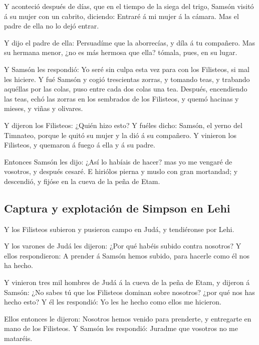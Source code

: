  Y aconteció después de días, que en el tiempo de la siega
del trigo, Samsón visitó á su mujer con un cabrito, diciendo: Entraré á
mi mujer á la cámara. Mas el padre de ella no lo dejó entrar.

 Y dijo el padre de ella: Persuadíme que la aborrecías, y
díla á tu compañero. Mas su hermana menor, ¿no es más hermosa que ella?
tómala, pues, en su lugar.

 Y Samsón les respondió: Yo seré sin culpa esta vez para con
los Filisteos, si mal les hiciere.  Y fué Samsón y cogió
trescientas zorras, y tomando teas, y trabando aquéllas por las colas,
puso entre cada dos colas una tea.  Después, encendiendo las
teas, echó las zorras en los sembrados de los Filisteos, y quemó hacinas
y mieses, y viñas y olivares.

 Y dijeron los Filisteos: ¿Quién hizo esto? Y fuéles dicho:
Samsón, el yerno del Timnateo, porque le quitó su mujer y la dió á su
compañero. Y vinieron los Filisteos, y quemaron á fuego á ella y á su
padre.

 Entonces Samsón les dijo: ¿Así lo habíais de hacer? mas yo
me vengaré de vosotros, y después cesaré.  E hiriólos pierna
y muslo con gran mortandad; y descendió, y fijóse en la cueva de la peña
de Etam.

\hypertarget{captura-y-explotaciuxf3n-de-simpson-en-lehi}{%
\subsection{Captura y explotación de Simpson en
Lehi}\label{captura-y-explotaciuxf3n-de-simpson-en-lehi}}

 Y los Filisteos subieron y pusieron campo en Judá, y
tendiéronse por Lehi.

 Y los varones de Judá les dijeron: ¿Por qué habéis subido
contra nosotros? Y ellos respondieron: A prender á Samsón hemos subido,
para hacerle como él nos ha hecho.

 Y vinieron tres mil hombres de Judá á la cueva de la peña
de Etam, y dijeron á Samsón: ¿No sabes tú que los Filisteos dominan
sobre nosotros? ¿por qué nos has hecho esto? Y él les respondió: Yo les
he hecho como ellos me hicieron.

 Ellos entonces le dijeron: Nosotros hemos venido para
prenderte, y entregarte en mano de los Filisteos. Y Samsón les
respondió: Juradme que vosotros no me mataréis.

